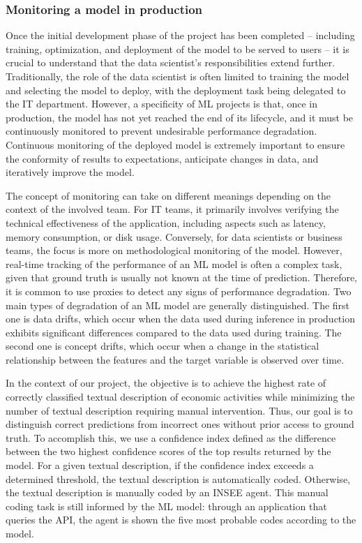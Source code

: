 \documentclass[graybox]{svmult}
\begin{document}
\subsubsection{Monitoring a model in production}
\label{subsubsec:monitoring}

Once the initial development phase of the project has been completed -- including training, optimization, and deployment of the model to be served to users -- it is crucial to understand that the data scientist's responsibilities extend further. Traditionally, the role of the data scientist is often limited to training the model and selecting the model to deploy, with the deployment task being delegated to the IT department. However, a specificity of ML projects is that, once in production, the model has not yet reached the end of its lifecycle, and it must be continuously monitored to prevent undesirable performance degradation. Continuous monitoring of the deployed model is extremely important to ensure the conformity of results to expectations, anticipate changes in data, and iteratively improve the model.

The concept of monitoring can take on different meanings depending on the context of the involved team. For IT teams, it primarily involves verifying the technical effectiveness of the application, including aspects such as latency, memory consumption, or disk usage. Conversely, for data scientists or business teams, the focus is more on methodological monitoring of the model. However, real-time tracking of the performance of an ML model is often a complex task, given that ground truth is usually not known at the time of prediction. Therefore, it is common to use proxies to detect any signs of performance degradation. Two main types of degradation of an ML model are generally distinguished. The first one is data drifts, which occur when the data used during inference in production exhibits significant differences compared to the data used during training. The second one is concept drifts, which occur when a change in the statistical relationship between the features and the target variable is observed over time.

In the context of our project, the objective is to achieve the highest rate of correctly classified textual description of economic activities while minimizing the number of textual description requiring manual intervention. Thus, our goal is to distinguish correct predictions from incorrect ones without prior access to ground truth. To accomplish this, we use a confidence index defined as the difference between the two highest confidence scores of the top results returned by the model. For a given textual description, if the confidence index exceeds a determined threshold, the textual description is automatically coded. Otherwise, the textual description is manually coded by an INSEE agent. This manual coding task is still informed by the ML model: through an application that queries the API, the agent is shown the five most probable codes according to the model. 
\end{document}
